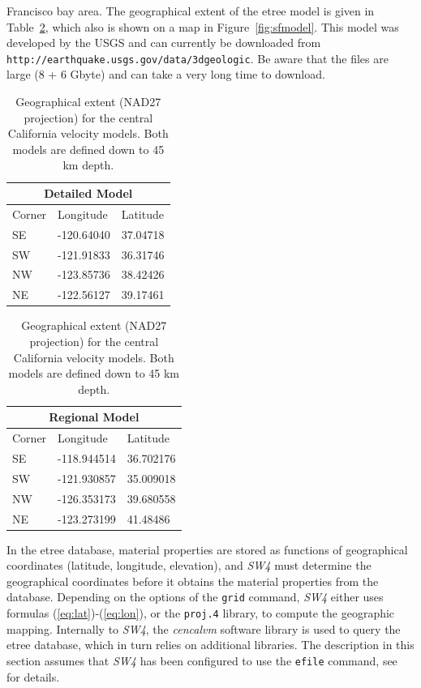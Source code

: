 \documentclass[11pt]{report}
\begin{document}
Francisco bay area. The geographical extent of the etree model is given in Table~\ref{tab:sfdata},
which also is shown on a map in Figure~\ref{fig:sfmodel}. This model was developed by the USGS and
can currently be downloaded from {\tt http://earthquake.usgs.gov/data/3dgeologic}. Be aware that the files
are large (8 + 6 Gbyte) and can take a very long time to download.
\begin{table}
\begin{center}
\begin{tabular}{|l|l|l|} \hline
\multicolumn{3}{|c|}{\bf Detailed Model} \\ \hline
Corner & Longitude & Latitude \\ \hline
SE & -120.64040 & 37.04718 \\ \hline
SW & -121.91833 & 36.31746 \\ \hline
NW & -123.85736 & 38.42426 \\ \hline
NE & -122.56127 & 39.17461 \\ \hline
\end{tabular} \hspace{5 mm}
\begin{tabular}{|l|l|l|} \hline
\multicolumn{3}{|c|}{\bf Regional Model} \\ \hline
Corner & Longitude & Latitude \\ \hline
SE & -118.944514 & 36.702176 \\ \hline
SW & -121.930857 & 35.009018 \\ \hline
NW & -126.353173 & 39.680558 \\ \hline
NE & -123.273199 & 41.48486\\ \hline
\end{tabular}
\caption{Geographical extent (NAD27 projection) for the central California velocity models. Both
  models are defined down to 45 km depth.}\label{tab:sfdata}
\end{center}
\end{table}%

In the etree database, material properties are stored as functions of geographical coordinates
(latitude, longitude, elevation), and \emph{SW4} must determine the geographical coordinates before
it obtains the material properties from the database. Depending on the options of the \verb+grid+
command, \emph{SW4} either uses formulas (\ref{eq:lat})-(\ref{eq:lon}), or the \verb+proj.4+
library, to compute the geographic mapping. Internally to \emph{SW4}, the \emph{cencalvm} software
library is used to query the etree database, which in turn relies on additional libraries. The
description in this section assumes that \emph{SW4} has been configured to use the \verb+efile+
command, see~\cite{SW4-install} for details.
\end{document}
